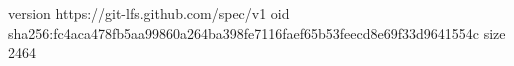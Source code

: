 version https://git-lfs.github.com/spec/v1
oid sha256:fc4aca478fb5aa99860a264ba398fe7116faef65b53feecd8e69f33d9641554c
size 2464
